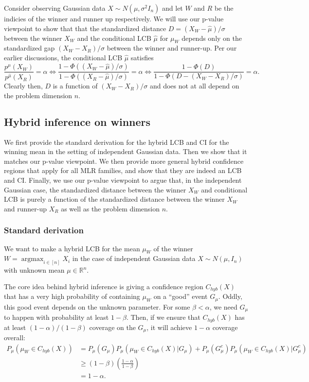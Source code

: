 \documentclass{article}
\DeclareMathOperator*{\argmax}{argmax}
\newcommand{\R}{\mathbb{R}}
\begin{document}
\begin{appendix}
Consider observing Gaussian data $X \sim N(\mu, \sigma^2 I_n)$ and let $W$ and $R$ be the indicies of the winner and runner up respectively. We will use our p-value viewpoint to show that that the standardized distance $D = (X_W - \hat{\mu})/\sigma$ between the winner $X_W$ and the conditional LCB $\hat{\mu}$ for $\mu_W$ depends only on the standardized gap $(X_W - X_R)/\sigma$ between the winner and runner-up. Per our earlier discussions, the conditional LCB $\hat{\mu}$ satisfies 
\begin{equation*}
    \frac{p^{\hat{\mu}}(X_W)}{p^{\hat{\mu}}(X_R)} = \alpha \iff \frac{1 - \Phi((X_W - \hat{\mu})/\sigma )}{1 - \Phi((X_R - \hat{\mu})/\sigma)} = \alpha \iff \frac{1 - \Phi(D)}{1 - \Phi(D - (X_W - X_R)/\sigma)} =\alpha.
\end{equation*}
Clearly then, $D$ is a function of $(X_W - X_R)/\sigma$ and does not at all depend on the problem dimension $n$. 

\subsection{Hybrid inference on winners}
\label{sec:hybrid_appdx}

We first provide the standard derivation for the hybrid LCB and CI for the winning mean in the setting of independent Gaussian data. Then we show that it matches our p-value viewpoint. We then provide more general hybrid confidence regions that apply for all MLR families, and show that they are indeed an LCB and CI. Finally, we use our p-value viewpoint to argue that, in the independent Gaussian case, the standardized distance between the winner $X_W$ and conditional LCB is purely a function of the standardized distance between the winner $X_W$ and runner-up $X_R$ as well as the problem dimension $n$. 

\subsubsection{Standard derivation}

We want to make a hybrid LCB for the mean $\mu_{W}$ of the winner $W = \argmax_{i \in [n]} X_i$ in the case of independent Gaussian data $X \sim N(\mu, I_n)$ with unknown mean $\mu \in \R^n$. 

The core idea behind hybrid inference is giving a confidence region $C_{hyb}(X)$ that has a very high probability of containing $\mu_W$ on a ``good'' event $G_{\mu}$. Oddly, this good event depends on the unknown parameter. For some $\beta < \alpha$, we need $G_{\mu}$ to happen with probability at least $1-\beta$. Then, if we ensure that $C_{hyb}(X)$ has at least $(1-\alpha)/(1-\beta)$ coverage on the $G_{\mu}$, it will achieve $1-\alpha$ coverage overall:
\begin{align*}
       P_{\mu}(\mu_{W} \in C_{hyb}(X)) &= P_{\mu}(G_{\mu})P_{\mu}(\mu_{W} \in C_{hyb}(X) | G_{\mu}) + P_{\mu}(G_{\mu}^c)P_{\mu}(\mu_{W} \in C_{hyb}(X) | G_{\mu}^c)\\
       &\geq (1-\beta)\left(\frac{1-\alpha}{1-\beta} \right)\\
       &=1-\alpha.
\end{align*}


\end{appendix}
\end{document}
